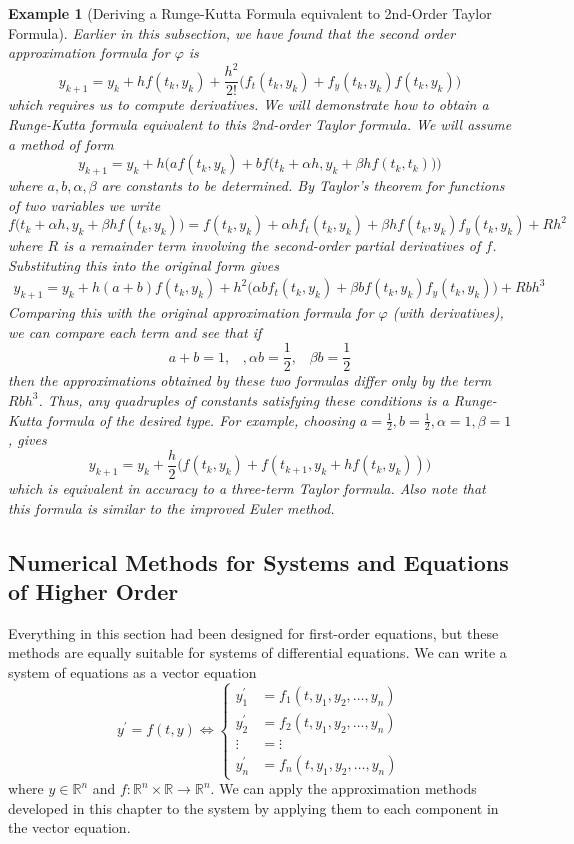 \documentclass{article}
\newtheorem{example}{Example}[section]
\theoremstyle{remark}
\theoremstyle{definition}
\begin{document}
    \begin{example}[Deriving a Runge-Kutta Formula equivalent to 2nd-Order Taylor Formula]
    Earlier in this subsection, we have found that the second order approximation formula for $\varphi$ is 
    \[y_{k+1} = y_k + h f(t_k, y_k) + \frac{h^2}{2!} \big( f_t (t_k, y_k) + f_y (t_k, y_k) f(t_k, y_k)\big)\]
    which requires us to compute derivatives. We will demonstrate how to obtain a Runge-Kutta formula equivalent to this 2nd-order Taylor formula. We will assume a method of form 
    \[y_{k+1} = y_k + h \Big( af(t_k, y_k) + b f\big( t_k + \alpha h, y_k + \beta h f(t_k, t_k)\big)\Big)\]
    where $a, b, \alpha, \beta$ are constants to be determined. By Taylor's theorem for functions of two variables we write
    \[f\big(t_k + \alpha h, y_k + \beta h f(t_k, y_k)\big) = f(t_k, y_k) + \alpha h f_t (t_k, y_k) + \beta h f(t_k, y_k) f_y (t_k, y_k) + R h^2\]
    where $R$ is a remainder term involving the second-order partial derivatives of $f$. Substituting this into the original form gives
    \begin{align*}
        y_{k+1} = y_k + h(a + b) f(t_k, y_k) + h^2 \big( \alpha b f_t (t_k, y_k) + \beta b f(t_k, y_k) f_y (t_k, y_k)\big) + R b h^3
    \end{align*}
    Comparing this with the original approximation formula for $\varphi$ (with derivatives), we can compare each term and see that if
    \[a + b = 1, \;\;\;, \alpha b = \frac{1}{2}, \;\;\; \beta b = \frac{1}{2}\]
    then the approximations obtained by these two formulas differ only by the term $R b h^3$. Thus, any quadruples of constants satisfying these conditions is a Runge-Kutta formula of the desired type. For example, choosing $a = \frac{1}{2}, b = \frac{1}{2}, \alpha = 1, \beta = 1$, gives
    \[y_{k+1} = y_k + \frac{h}{2} \big( f(t_k, y_k) + f(t_{k+1}, y_k + h f(t_k, y_k))\big)\]
    which is equivalent in accuracy to a three-term Taylor formula. Also note that this formula is similar to the improved Euler method. 
    \end{example}

  \subsection{Numerical Methods for Systems and Equations of Higher Order}

    Everything in this section had been designed for first-order equations, but these methods are equally suitable for systems of differential equations. We can write a system of equations as a vector equation
    \[y^\prime = f(t, y) \iff \begin{cases}
    y_1^\prime & = f_1 (t, y_1, y_2, \ldots, y_n) \\
    y_2^\prime & = f_2 (t, y_1, y_2, \ldots, y_n) \\
    \vdots & = \vdots \\
    y_n^\prime & = f_n (t, y_1, y_2, \ldots, y_n)
    \end{cases}\]
    where $y \in \mathbb{R}^n$ and $f: \mathbb{R}^n \times \mathbb{R} \longrightarrow \mathbb{R}^n$. We can apply the approximation methods developed in this chapter to the system by applying them to each component in the vector equation. 
\end{document}
